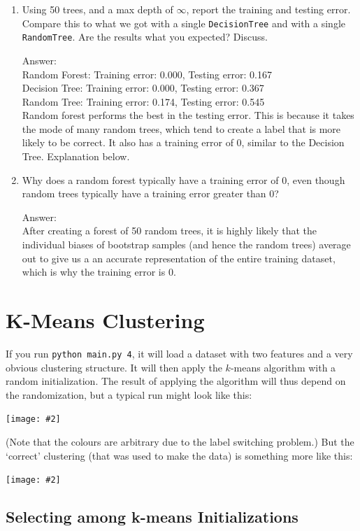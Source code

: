 \documentclass{article}
\def\ans#1{\par\gre{Answer: #1}}
\def\blu#1{{\color{blu}#1}}
\def\gre#1{{\color{gre}#1}}
\let\ask\blu
\newcommand{\centerfig}[2]{\begin{center}\texttt{[image: \#2]}\end{center}}
\begin{document}
\begin{enumerate}
        \item Using 50 trees, and a max depth of $\infty$, \ask{report the training and testing error}. Compare this to what we got with a single \texttt{DecisionTree} and with a single \texttt{RandomTree}. \ask{Are the results what you expected? Discuss.}
        \ans{\\
        Random Forest: Training error: 0.000, Testing error: 0.167\\
        Decision Tree: Training error: 0.000, Testing error: 0.367\\
        Random Tree: Training error: 0.174, Testing error: 0.545\\
        Random forest performs the best in the testing error. This is because it takes the mode of many random trees, which tend to create a label that is more likely to be correct. It also has a training error of 0, similar to the Decision Tree. Explanation below.
        }
        \item \ask{Why does a random forest typically have a training error of 0, even though random trees typically have a training error greater than 0?}
        \ans{\\
        After creating a forest of 50 random trees, it is highly likely that the individual biases of bootstrap samples (and hence the random trees) average out to give us a 
        an accurate representation of the entire training dataset, which is why the training error is 0.
        }
    \end{enumerate}

\pagebreak

\section{K-Means Clustering}

If you run \verb|python main.py 4|, it will load a dataset with two features
and a very obvious clustering structure. It will then apply the $k$-means algorithm
with a random initialization. The result of applying the
algorithm will thus depend on the randomization, but a typical run might look like this:
\centerfig{.5}{figs/kmeans_basic.png}
(Note that the colours are arbitrary due to the label switching problem.)
But the `correct' clustering (that was used to make the data) is something more like this:
\centerfig{.5}{figs/kmeans_good.png}

\pagebreak

\subsection{Selecting among k-means Initializations}
\end{document}
